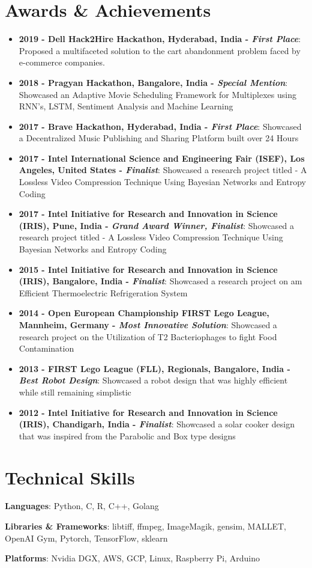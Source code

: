 \documentclass[letterpaper,11pt]{article}
\newcommand{\resumeItem}[2]{
    \item\small{
        \textbf{#1}{: #2 \vspace{-2pt}}
    }
}
\newcommand{\resumeSubItem}[2]{\resumeItem{#1}{#2}\vspace{-4pt}}
\newcommand{\resumeSubHeadingListStart}{\begin{itemize}[leftmargin=*]}
\newcommand{\resumeSubHeadingListEnd}{\end{itemize}}
\begin{document}
\section{Awards \& Achievements}
    \resumeSubHeadingListStart
        \resumeSubItem{2019 - Dell Hack2Hire Hackathon, Hyderabad, India - \textit{First Place}}
            {Proposed a multifaceted solution to the cart abandonment problem faced by e-commerce companies.}
        \resumeSubItem{2018 - Pragyan Hackathon, Bangalore, India - \textit{Special Mention}}
            {Showcased an Adaptive Movie Scheduling Framework for Multiplexes using RNN's, LSTM, Sentiment Analysis and Machine Learning}
      \resumeSubItem{2017 - Brave Hackathon, Hyderabad, India - \textit{First Place}}
            {Showcased a Decentralized Music Publishing and Sharing Platform built over 24 Hours}
      \resumeSubItem{2017 - Intel International Science and Engineering Fair (ISEF), Los Angeles, United States - \textit{Finalist}}
            {Showcased a research project titled - A Lossless Video Compression Technique Using Bayesian Networks and Entropy Coding}
      \resumeSubItem{2017 - Intel Initiative for Research and Innovation in Science (IRIS), Pune, India - \textit{Grand Award Winner, Finalist}}
            {Showcased a research project titled - A Lossless Video Compression Technique Using Bayesian Networks and Entropy Coding}
      \resumeSubItem{2015 - Intel Initiative for Research and Innovation in Science (IRIS), Bangalore, India - \textit{Finalist}}
            {Showcased a research project on am Efficient Thermoelectric Refrigeration System}
      \resumeSubItem{2014 - Open European Championship FIRST Lego League, Mannheim, Germany - \textit{Most Innovative Solution}}
            {Showcased a research project on the Utilization of T2 Bacteriophages to fight Food Contamination}
      \resumeSubItem{2013 - FIRST Lego League (FLL), Regionals, Bangalore, India - \textit{Best Robot Design}}
            {Showcased a robot design that was highly efficient while still remaining simplistic}
      \resumeSubItem{2012 - Intel Initiative for Research and Innovation in Science (IRIS), Chandigarh, India - \textit{Finalist}}
            {Showcased a solar cooker design that was inspired from the Parabolic and Box type designs}
    \resumeSubHeadingListEnd

\section{Technical Skills}
  \resumeSubHeadingListStart
    \item{\textbf{Languages}{: Python, C, R, C++, Golang}
    \item{\textbf{Libraries \& Frameworks}{: libtiff, ffmpeg, ImageMagik, gensim, MALLET, OpenAI Gym, Pytorch, TensorFlow, sklearn}}
    \item{\textbf{Platforms}{: Nvidia DGX, AWS, GCP, Linux, Raspberry Pi, Arduino}}}
  \resumeSubHeadingListEnd
\end{document}
